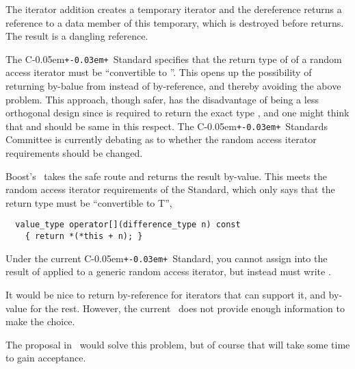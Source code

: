 \documentclass{netobjectdays}
\newcommand{\Cpp}{C\kern-0.05em\texttt{+\kern-0.03em+}}
\newcommand{\iteratoradaptor}{\code{iterator\_\-adaptor}}
\newcommand{\iteratortraits}{\code{iterator\_\-traits}}
\begin{document}
\noindent The iterator addition creates a temporary iterator and the
dereference returns a reference to a data member of this temporary,
which is destroyed before  returns. The result is a
dangling reference.

The \Cpp\ Standard specifies that the return type of 
of a random access iterator must be ``convertible to ''.  This
opens up the possibility of returning by-balue from 
instead of by-reference, and thereby avoiding the above problem.  This
approach, though safer, has the disadvantage of being a less
orthogonal design since  is required to return the
exact type , and one might think that  and
 should be same in this respect.  The \Cpp\ Standards
Committee is currently debating as to whether the random access
iterator requirements should be changed.

Boost's \iteratoradaptor\ takes the safe route and returns the result
by-value. This meets the random access iterator requirements of the
Standard, which only says that the return type must be ``convertible
to T'',

{\footnotesize
\begin{verbatim}
  value_type operator[](difference_type n) const
    { return *(*this + n); }
\end{verbatim}
}

Under the current \Cpp\ Standard, you cannot assign into the result of
 applied to a generic random access iterator,
but instead must write .

It would be nice to return by-reference for iterators that can support
it, and by-value for the rest. However, the current
\iteratortraits\ does not provide enough information to make the
choice.



The proposal in~\cite{siek01:_improved_iter_cat} would solve this
problem, but of course that will take some time to gain acceptance.
\end{document}
